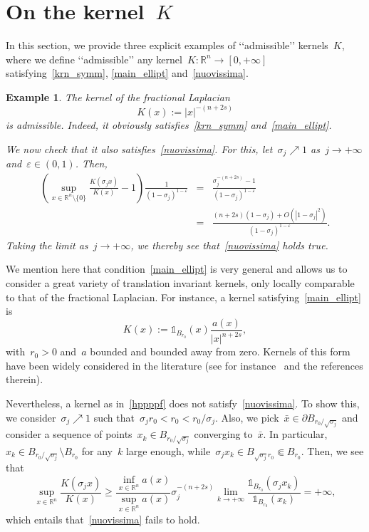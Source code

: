 \documentclass[10pt,a4paper]{amsart}
\newtheorem{example}[theorem]{Example}
\numberwithin{equation}{section}
\newcommand{\R}{\mathbb{R}}
\renewcommand{\epsilon}{\varepsilon}
\begin{document}
    
     \appendix

 \section{On the kernel~$K$}\label{kern_ex}
 In this section, we provide three explicit examples of \lq\lq{}admissible\rq\rq{} kernels~$K$, where we define \lq\lq{}admissible\rq\rq{} any kernel~$K:\R^n \to [0,+\infty]$ satisfying~\eqref{krn_symm}, \eqref{main_ellipt}  and~\eqref{nuovissima}. 
 
\begin{example}{\rm{
The kernel of the fractional Laplacian
$$
K(x) := | x |^{-( n+2s)}
$$
is admissible. 
Indeed, it obviously satisfies~\eqref{krn_symm} and~\eqref{main_ellipt}.

We now check that it also satisfies~\eqref{nuovissima}. 
For this, let~$\sigma_j\nearrow1$ as~$j \to +\infty$ and~$\epsilon \in (0,1)$. Then,
\begin{eqnarray*}
\left(\sup_{x \in \R^n \setminus\{0\}} \frac{K(\sigma_j x)}{K(x)} -1\right) \frac{1}{(1-\sigma_j)^{1-\epsilon}} &
= & \frac{\sigma_j^{-(n+2s)}-1}{(1-\sigma_j)^{1-\epsilon}} \\ 
&=& \frac{(n+2s)(1-\sigma_j)+O(| 1 -\sigma_j|^2)}{(1-\sigma_j)^{1-\epsilon}}.
\end{eqnarray*}
Taking the limit as~$j\to+\infty$, we thereby see that~\eqref{nuovissima} holds true.
}}
\end{example}

We mention here that condition~\eqref{main_ellipt} is very general and allows us to consider a great variety of translation invariant kernels, only locally comparable to that of the fractional Laplacian. For instance, a kernel satisfying~\eqref{main_ellipt} is
\begin{equation}\label{hppppf}
K(x) := \mathds{1}_{B_{r_0}}(x) \frac{a(x)}{| x |^{n+2s}},
\end{equation}
with~$r_0>0$ and~$a$ bounded and bounded away from zero.
Kernels of this form
have been widely considered in the literature (see for instance~\cite{KKL16} and the references therein).

Nevertheless, a kernel as in~\eqref{hppppf} does not satisfy~\eqref{nuovissima}. To show this, we consider~$\sigma_j \nearrow 1$ such that~$\sigma_j r_0 < r_0 < r_0/\sigma_j$. Also, we pick~$\bar{x} \in \partial B_{r_0/\sqrt{\sigma_j}}$ and consider a sequence of points~$x_k \in  B_{r_0/\sqrt{\sigma_j}}$ converging to~$\bar{x}$. In particular, ${x_k \in B_{r_0/\sqrt{\sigma_j}} \setminus B_{r_0}}$ for any~$k$ large enough, while~$\sigma_j x_k \in B_{\sqrt{\sigma_j}r_0} \Subset B_{r_0}$. Then, we see that
\[
\sup_{x \in \R^n} \frac{K(\sigma_j x)}{K(x)} \geq \frac{\displaystyle\inf_{x\in \R^n} a(x)} {\displaystyle\sup_{x\in\R^n}a(x)}\sigma_j^{-(n+2s)} \lim_{k \to +\infty} \frac{ \mathds{1}_{B_{r_0}}(\sigma_j x_k)}{\mathds{1}_{B_{r_0}}(x_k)} = +\infty,
\]
which entails that~\eqref{nuovissima} fails to hold.
\end{document}
